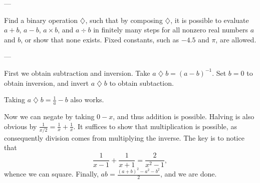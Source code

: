 
---

Find a binary operation $\mathbin\diamondsuit$, such that by composing $\mathbin\diamondsuit$, it is possible to evaluate $a+b$, $a-b$, $a\times b$, and $a\div b$ in finitely many steps for all nonzero real numbers $a$ and $b$, or show that none exists. Fixed constants, such as $-4.5$ and $\pi$, are allowed.

---

First we obtain subtraction and inversion. Take $a\mathbin\diamondsuit b=(a-b)^{-1}$. Set $b=0$ to obtain inversion, and invert $a\mathbin\diamondsuit b$ to obtain subtaction.
\begin{boxremark}
    Taking $a\mathbin\diamondsuit b=\frac1a-b$ also works.
\end{boxremark}
Now we can negate by taking $0-x$, and thus addition is possible. Halving is also obvious by $\frac1{x/2}=\frac1x+\frac1x$. It suffices to show that multiplication is possible, as consequently division comes from multiplying the inverse. The key is to notice that\[\frac1{x-1}+\frac1{x+1}=\frac2{x^2-1},\]
whence we can square. Finally, $ab=\frac{(a+b)^2-a^2-b^2}2$, and we are done.

